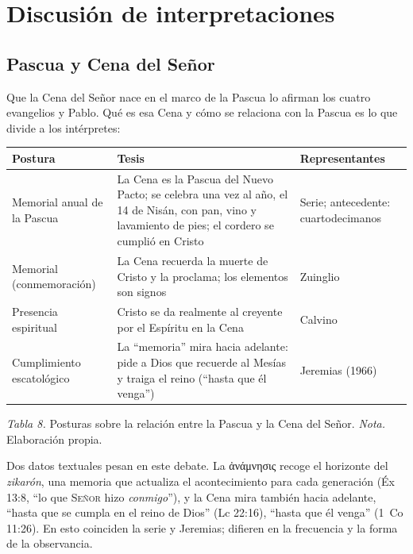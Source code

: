 \documentclass[11pt,letterpaper]{article}
\newcommand{\grc}[1]{\foreignlanguage{ancientgreek}{#1}}
\newcommand{\SENOR}{\textsc{Señor}}
\begin{document}
\section{Discusión de interpretaciones}

\subsection{Pascua y Cena del Señor}
Que la Cena del Señor nace en el marco de la Pascua lo afirman los cuatro evangelios y Pablo. Qué es esa Cena y cómo se relaciona con la Pascua es lo que divide a los intérpretes:

\begin{table}[!htbp]\centering\small\renewcommand{\arraystretch}{1.2}
\begin{tabular}{@{}L{3.1cm}L{7.6cm}L{3.7cm}@{}}
\toprule
\textbf{Postura} & \textbf{Tesis} & \textbf{Representantes} \\ \midrule
Memorial anual de la Pascua & La Cena es la Pascua del Nuevo Pacto; se celebra una vez al año, el 14 de Nisán, con pan, vino y lavamiento de pies; el cordero se cumplió en Cristo & Serie; antecedente: cuartodecimanos \\
Memorial (conmemoración) & La Cena recuerda la muerte de Cristo y la proclama; los elementos son signos & Zuinglio \\
Presencia espiritual & Cristo se da realmente al creyente por el Espíritu en la Cena & Calvino \\
Cumplimiento escatológico & La ``memoria'' mira hacia adelante: pide a Dios que recuerde al Mesías y traiga el reino (``hasta que él venga'') & Jeremias (1966) \\
\bottomrule
\end{tabular}\par
{\footnotesize\color{sepia}\textit{Tabla 8.} Posturas sobre la relación entre la Pascua y la Cena del Señor. \textit{Nota.} Elaboración propia.}
\end{table}

Dos datos textuales pesan en este debate. La \grc{ἀνάμνησις} recoge el horizonte del \emph{zikarón}, una memoria que actualiza el acontecimiento para cada generación (Éx 13:8, ``lo que \SENOR{} hizo \emph{conmigo}''), y la Cena mira también hacia adelante, ``hasta que se cumpla en el reino de Dios'' (Lc 22:16), ``hasta que él venga'' (1~Co 11:26). En esto coinciden la serie y Jeremias; difieren en la frecuencia y la forma de la observancia.
\end{document}
